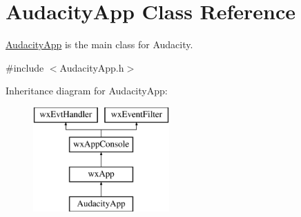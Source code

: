 \hypertarget{class_audacity_app}{}\section{Audacity\+App Class Reference}
\label{class_audacity_app}


\hyperlink{class_audacity_app}{Audacity\+App} is the \textquotesingle{}main\textquotesingle{} class for Audacity.  




{\ttfamily \#include $<$Audacity\+App.\+h$>$}

Inheritance diagram for Audacity\+App\+:\begin{figure}[H]
\begin{center}
\leavevmode
\includegraphics[height=4.000000cm]{class_audacity_app}
\end{center}
\end{figure}
